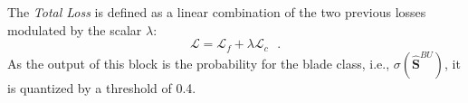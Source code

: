 The \textit{Total Loss} is defined as a linear combination of the two previous losses modulated by the scalar $\lambda$:
\begin{equation}
\label{total_loss}
\mathcal L = \mathcal L_{f} + \lambda\mathcal L_{c}\text{ } .
\end{equation}
 As the output of this block is the probability for the blade class, i.e., $\sigma(\hat{\mathbf{S}}^{BU})$, it is quantized by a threshold of 0.4.






